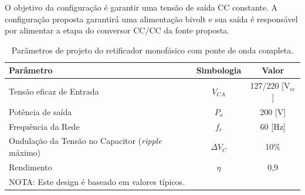
O objetivo da configuração é garantir uma tensão de saída CC constante. A configuração proposta garantirá uma alimentação bivolt e sua saída é responsável por alimentar a etapa do conversor CC/CC da fonte proposta.

\begin{table}[H]
    \centering
    \footnotesize
    \caption{Parâmetros de projeto do retificador monofásico com ponte de onda completa.}
    \label{retificador}
    \begin{adjustbox}{max width = \textwidth}
        \begin{tabular}{|l|c|c|}
            \hline
            \rowcolor[HTML]{A8DADC}
            \textbf{Parâmetro} & \textbf{Simbologia} & \textbf{Valor}  \\ \hline
            Tensão eficaz de Entrada & $V_{CA}$ & 127/220 [V$_\text{cc}$]
            \\ \hline
              Potência de saída & $P_{o}$	 & 200 [V]
             \\ \hline
              Frequência da Rede & $f_{r}$	 & 60 [Hz]
             \\ \hline
               Ondulação da Tensão no Capacitor (\textit{ripple} máximo) & $\Delta V_{C}$ & 10\%
             \\ \hline
                Rendimento & $\eta$ & 0,9
             \\ \hline
              \multicolumn{3}{l}{NOTA: Este design é baseado em valores típicos.} \\ 
        \end{tabular}
    \end{adjustbox}
\end{table}

